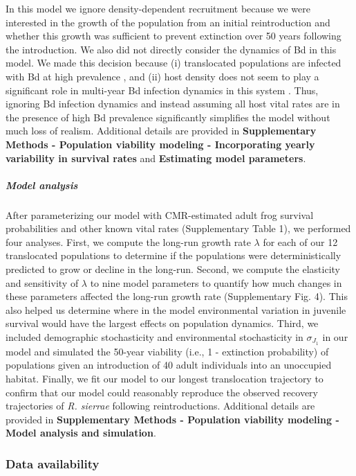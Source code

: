 \documentclass[
  letterpaper,
  DIV=11,
  numbers=noendperiod]{scrartcl}
\let\oldsubparagraph\subparagraph
\renewcommand{\subparagraph}[1]{\oldsubparagraph{#1}\mbox{}}
\begin{document}
In this model we ignore density-dependent recruitment because we were
interested in the growth of the population from an initial
reintroduction and whether this growth was sufficient to prevent
extinction over 50 years following the introduction. We also did not
directly consider the dynamics of Bd in this model. We made this
decision because (i) translocated populations are infected with Bd at
high prevalence \citep{joseph2018}, and (ii) host density does not seem
to play a significant role in multi-year Bd infection dynamics in this
system \citep{wilber2022}. Thus, ignoring Bd infection dynamics and
instead assuming all host vital rates are in the presence of high Bd
prevalence significantly simplifies the model without much loss of
realism. Additional details are provided in \textbf{Supplementary
Methods - Population viability modeling - Incorporating yearly
variability in survival rates} and \textbf{Estimating model parameters}.

\subparagraph{Model analysis}\label{model-analysis}

After parameterizing our model with CMR-estimated adult frog survival
probabilities and other known vital rates (Supplementary Table 1), we
performed four analyses. First, we compute the long-run growth rate
\(\lambda\) for each of our 12 translocated populations to determine if
the populations were deterministically predicted to grow or decline in
the long-run. Second, we compute the elasticity and sensitivity of
\(\lambda\) to nine model parameters to quantify how much changes in
these parameters affected the long-run growth rate (Supplementary Fig.
4). This also helped us determine where in the model environmental
variation in juvenile survival would have the largest effects on
population dynamics. Third, we included demographic stochasticity and
environmental stochasticity in \(\sigma_{J_1}\) in our model and
simulated the 50-year viability (i.e., 1 - extinction probability) of
populations given an introduction of 40 adult individuals into an
unoccupied habitat. Finally, we fit our model to our longest
translocation trajectory to confirm that our model could reasonably
reproduce the observed recovery trajectories of \emph{R. sierrae}
following reintroductions. Additional details are provided in
\textbf{Supplementary Methods - Population viability modeling - Model
analysis and simulation}.

\subsubsection{Data availability}\label{data-availability}
\end{document}

